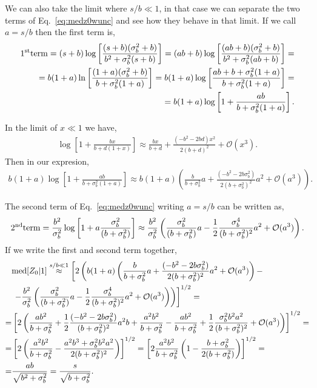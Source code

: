 \documentclass[12pt,a4paper]{article}
\newcommand{\approxtext}[1]{\ensuremath{\stackrel{#1}{\approx}}}
\begin{document}
We can also take the limit where $s/b\ll 1$, in that case we can separate the two terms of Eq.~\eqref{eq:medz0wunc} and see how they behave in that limit. If we call $a=s/b$ then the first term is,
\begin{align}
{\rm 1^{st} term}=(s+b)\log\left[\frac{(s+b)(\sigma_b^2+b)}{b^2+\sigma_b^2(s+b)}\right]=(ab+b)\log\left[\frac{(ab+b)(\sigma_b^2+b)}{b^2+\sigma_b^2(ab+b)}\right]=\notag\\=b(1+a)\ln\left[\frac{(1+a)(\sigma_b^2+b)}{b+\sigma_b^2(1+a)}\right]=b(1+a)\log\left[\frac{ab + b +\sigma_b^2(1+a)}{b+\sigma_b^2(1+a)}\right]=\notag\\
=b(1+a)\log\left[1+\frac{ab}{b+\sigma_b^2(1+a)}\right].
\end{align}

In the limit of $x\ll 1$ we have,
\begin{align}
\log\left[1+\frac{bx}{b+d(1+x)}\right]\approx\frac{bx}{b+d}+\frac{(-b^2-2bd)x^2}{2(b+d)^2}+\mathcal{O}(x^3).
\end{align}
Then in our expresion,
\begin{align}
b(1+a)\log\left[1+\frac{ab}{b+\sigma_b^2(1+a)}\right]\approx b(1+a)\left(\frac{b}{b+\sigma_b^2}a+\frac{(-b^2-2b\sigma_b^2)}{2(b+\sigma_b^2)^2}a^2+\mathcal{O}(a^3)\right).
\end{align}

The second term of Eq.~\eqref{eq:medz0wunc} writing $a=s/b$ can be written as,
\begin{align}
{\rm 2^{nd} term}=\frac{b^2}{\sigma_b^2}\log\left[1+a\frac{\sigma_b^2}{(b+\sigma_b^2)}\right]\approx \frac{b^2}{\sigma_b^2}\left(\frac{\sigma_b^2}{(b + \sigma_b^2)}a -\frac{1}{2}\frac{\sigma_b^4}{(b+\sigma_b^2)^2} a^2+\mathcal{O}(a^3)\right).
\end{align}
If we write the first and second term together,
\begin{align}
&{\rm med}[Z_0|1]\approxtext{s/b\ll 1}\left[2\left(b(1+a)\left(\frac{b}{b+\sigma_b^2}a+\frac{(-b^2-2b\sigma_b^2)}{2(b+\sigma_b^2)^2}a^2+\mathcal{O}(a^3)\right)-\right.\right.\notag \\
&\left.\left.-\frac{b^2}{\sigma_b^2}\left(\frac{\sigma_b^2}{(b + \sigma_b^2)}a -\frac{1}{2}\frac{\sigma_b^4}{(b+\sigma_b^2)^2} a^2+\mathcal{O}(a^3)\right)\right)\right]^{1/2}=\notag\\
=&\left[2\left(\frac{ab^2}{b+\sigma_b^2}+\frac{1}{2}\frac{(-b^2-2b\sigma_b^2)}{(b+\sigma_b^2)^2}a^2b+\frac{a^2b^2}{b+\sigma_b^2}-\frac{ab^2}{b+\sigma_b^2}+\frac{1}{2}\frac{\sigma_b^2b^2a^2}{(b+\sigma_b^2)^2}+\mathcal{O}(a^3)\right)\right]^{1/2}=\notag\\
=&\left[2\left(\frac{a^2b^2}{b+\sigma_b^2}-\frac{a^2b^3+\sigma_b^2b^2a^2}{2(b+\sigma_b^2)^2}\right)\right]^{1/2}=\left[2\frac{a^2b^2}{b+\sigma_b^2}\left(1-\frac{b+\sigma_b^2}{2(b+\sigma_b^2)}\right)\right]^{1/2}=\notag\\=&\frac{ab}{\sqrt{b^2+\sigma_b^2}}=\frac{s}{\sqrt{b+\sigma_b^2}}.
\end{align}
\end{document}
